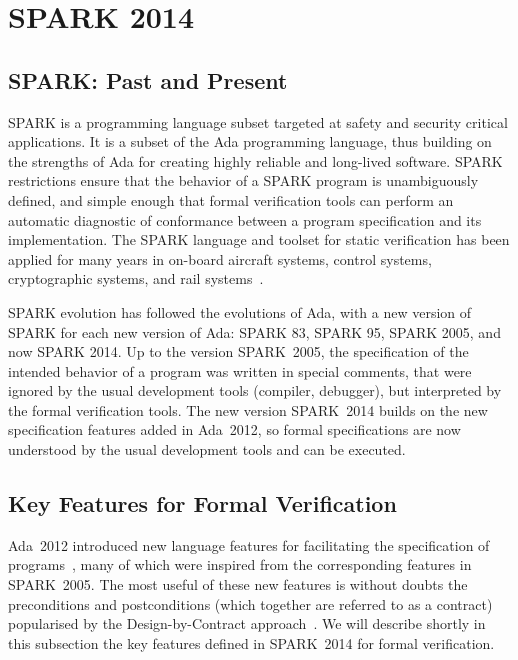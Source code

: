 \documentclass[10pt,a4paper,twocolumn]{article}
\newcommand{\oldspark}{SPARK~2005\xspace}
\newcommand{\newspark}{SPARK~2014\xspace}
\newcommand{\adatwtw}{Ada~2012\xspace}
\begin{document}
\section{SPARK 2014}

\subsection{SPARK: Past and Present}

SPARK is a programming language subset targeted at safety and security critical
applications. It is a subset of the Ada programming language, thus building on
the strengths of Ada for creating highly reliable and long-lived
software. SPARK restrictions ensure that the behavior of a SPARK program is
unambiguously defined, and simple enough that formal verification tools can
perform an automatic diagnostic of conformance between a program specification
and its implementation. The SPARK language and toolset for static verification
has been applied for many years in on-board aircraft systems, control systems,
cryptographic systems, and rail systems~\cite{sparkbook2012,oneill2012}.

SPARK evolution has followed the evolutions of Ada, with a new version of SPARK
for each new version of Ada: SPARK 83, SPARK 95, SPARK 2005, and now SPARK
2014. Up to the version \oldspark, the specification of the intended behavior
of a program was written in special comments, that were ignored by the usual
development tools (compiler, debugger), but interpreted by the formal
verification tools. The new version \newspark builds on the new specification
features added in \adatwtw, so formal specifications are now understood by the
usual development tools and can be executed.

\subsection{Key Features for Formal Verification}

\adatwtw introduced new language features for facilitating the specification of
programs~\cite{ada2012rationale}, many of which were inspired from the
corresponding features in \oldspark. The most useful of these new features is
without doubts the preconditions and postconditions (which together are
referred to as a contract) popularised by the Design-by-Contract
approach~\cite{meyer:1988:OSC}.
We will
describe shortly in this subsection the key features defined in \newspark for
formal verification.
\end{document}
